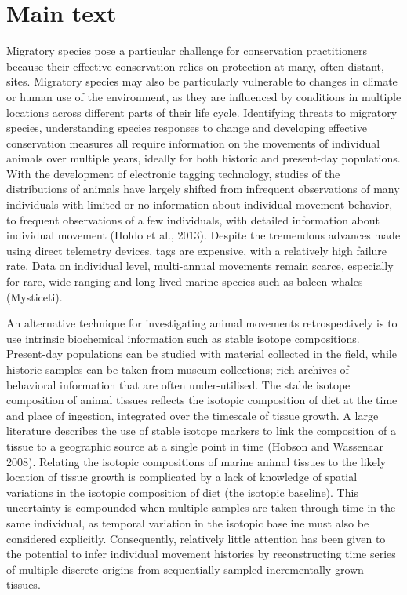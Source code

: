 \documentclass[a4paper,12pt]{article}
\begin{document}
\newpage
\section{Main text}
Migratory species pose a particular challenge for conservation practitioners because their effective conservation relies on protection at many, often distant, sites\cite{runge2014conserving}.
Migratory species may also be particularly vulnerable to changes in climate or human use of the environment, as they are influenced by conditions in multiple locations across different parts of their life cycle\cite{robinson2009travelling}. 
Identifying threats to migratory species, understanding species responses to change and developing effective conservation measures all require information on the movements of individual animals over multiple years, ideally for both historic and present-day populations. 
With the development of electronic tagging technology, studies of the distributions of animals have largely shifted from infrequent observations of many individuals with limited or no information about individual movement behavior, to frequent observations of a few individuals, with detailed information about individual movement (Holdo et al., 2013).  
Despite the tremendous advances made using direct telemetry devices, tags are expensive, with a relatively high failure rate. 
Data on individual level, multi-annual movements remain scarce, especially for rare, wide-ranging and long-lived marine species such as baleen whales (Mysticeti)\cite{ryan2013stable,hall2005stable,bailey2009behavioural}. 
 
An alternative technique for investigating animal movements retrospectively is to use intrinsic biochemical information such as stable isotope compositions. 
Present-day populations can be studied with material collected in the field, while historic samples can be taken from museum collections; rich archives of behavioral information that are often under-utilised. 
The stable isotope composition of animal tissues reflects the isotopic composition of diet at the time and place of ingestion, integrated over the timescale of tissue growth. 
A large literature describes the use of stable isotope markers to link the composition of a tissue to a geographic source at a single point in time (Hobson and Wassenaar 2008). 
Relating the isotopic compositions of marine animal tissues to the likely location of tissue growth is complicated by a lack of knowledge of spatial variations in the isotopic composition of diet (the isotopic baseline). 
This uncertainty is compounded when multiple samples are taken through time in the same individual, as temporal variation in the isotopic baseline must also be considered explicitly. 
Consequently, relatively little attention has been given to the potential to infer individual movement histories by reconstructing time series of multiple discrete origins from sequentially sampled incrementally-grown tissues.
\end{document}
